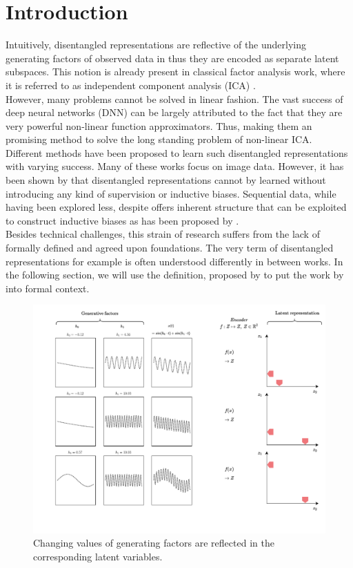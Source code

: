 \documentclass{article} %
\begin{document}
\section*{Introduction}
Intuitively, disentangled representations are reflective of the underlying generating factors of observed data in thus they are encoded as separate latent subspaces. This notion is already present in classical factor analysis work, where it is referred to as independent component analysis (ICA) \cite{comon1992independent}.\\
However, many problems cannot be solved in linear fashion. The vast success of deep neural networks (DNN) can be largely attributed to the fact that they are very powerful non-linear function approximators. Thus, making them an promising method to solve the long standing problem of non-linear ICA.\\
Different methods have been proposed to learn such disentangled representations \cite{higgins2016beta, chen2016infogan, kulkarni2015deep} with varying success. Many of these works focus on image data. However, it has been shown by \citet{locatello2019challenging} that disentangled representations cannot by learned without introducing any kind of supervision or inductive biases. Sequential data, while having been explored less, despite offers inherent structure that can be exploited to construct inductive biases as has been proposed by \citet{hsu2017unsupervised}.\\
Besides technical challenges, this strain of research suffers from the lack of formally defined and agreed upon foundations. The very term of disentangled representations for example is often understood differently in between works. In the following section, we will use the definition, proposed by \citet{higgins2018towards} to put the work by \citet{hsu2017unsupervised} into formal context. 

\begin{figure}
	\centering
	\includegraphics[width=.6\linewidth]{../figures/intution_3x3_static.pdf}
	\caption{Changing values of generating factors are reflected in the corresponding latent variables.}
\end{figure}
\end{document}
